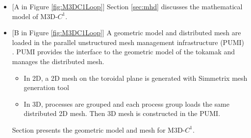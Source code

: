 \documentclass[11pt]{article}  %
\begin{document}
\begin{itemize}
\item{[A in Figure \ref{fig:M3DC1Loop}]} Section \ref{sec:mhd} discusses the mathematical model of M3D-$C^1$.
\item{[B in Figure \ref{fig:M3DC1Loop}]} A geometric model and distributed mesh are loaded in the parallel unstructured mesh management infrastructure (PUMI) \cite{pumi-web-page, Seol2014}. PUMI provides the interface to the geometric model of the tokamak and manages the distributed mesh. 
  \begin{itemize}
  \item In 2D, a 2D mesh on the toroidal plane is generated with Simmetrix mesh generation tool \cite{simmetrix-web-page}
  \item In 3D, processes are grouped and each process group loads the same distributed 2D mesh. Then 3D mesh is constructed in the PUMI.
  \end{itemize}
Section \label{sec:domain} presents the geometric model and mesh for M3D-$C^1$.


\end{itemize}
\end{document}
